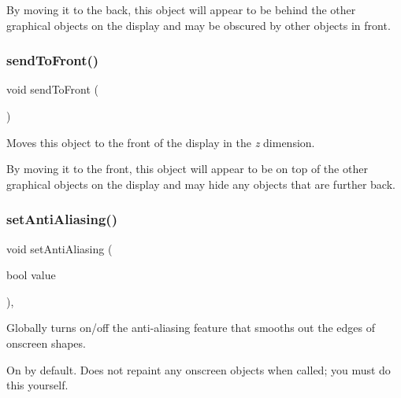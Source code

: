By moving it to the back, this object will appear to be behind the other graphical objects on the display and may be obscured by other objects in front. \mbox{\label{classGObject_aee33d68488e46827ef55fac07f40a9b2}} 
\subsubsection{\texorpdfstring{send\+To\+Front()}{sendToFront()}}
{\footnotesize\ttfamily void send\+To\+Front (\begin{DoxyParamCaption}{ }\end{DoxyParamCaption})\hspace{0.3cm}{\ttfamily [inherited]}}



Moves this object to the front of the display in the {\itshape z} dimension. 

By moving it to the front, this object will appear to be on top of the other graphical objects on the display and may hide any objects that are further back. \mbox{\label{classGObject_a1e43371668ae850193cebedb44e1bbe3}} 
\subsubsection{\texorpdfstring{set\+Anti\+Aliasing()}{setAntiAliasing()}}
{\footnotesize\ttfamily void set\+Anti\+Aliasing (\begin{DoxyParamCaption}\item[{bool}]{value }\end{DoxyParamCaption})\hspace{0.3cm}{\ttfamily [static]}, {\ttfamily [inherited]}}



Globally turns on/off the anti-\/aliasing feature that smooths out the edges of onscreen shapes. 

On by default. Does not repaint any onscreen objects when called; you must do this yourself. \mbox{\label{classGObject_a71ff7b16b8f1bdc4a1ce9f30cf8b87d8}} 
